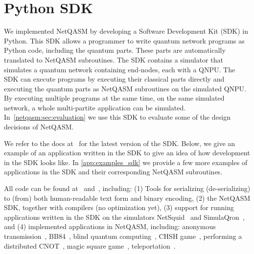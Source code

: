 \section{Python SDK}
\label{sec:python-sdk}
We implemented \ac{NetQASM} by developing a Software Development Kit (SDK) in Python.
This SDK allows a programmer to write quantum network programs as Python code, including the quantum parts.
These parts are automatically translated to NetQASM subroutines.
The SDK contains a simulator that simulates a quantum network containing end-nodes, each with a \ac{QNPU}.
The SDK can execute programs by executing their classical parts directly and executing the quantum parts as \ac{NetQASM} subroutines on the simulated \ac{QNPU}.
By executing multiple programs at the same time, on the same simulated network, a whole multi-partite application can be simulated.
In~\cref{netqasm:sec:evaluation} we use this SDK to evaluate some of the design decisions of \ac{NetQASM}.

We refer to the docs at~\cite{git_netqasm} for the latest version of the SDK.
Below, we give an example of an application written in the SDK to give an idea of how development in the SDK looks like.
In \cref{app:examples_sdk} we provide a few more examples of applications in the SDK and their corresponding \ac{NetQASM} subroutines.

All code can be found at~\cite{git_netqasm} and~\cite{git_squidasm}, including:
    (1) Tools for serializing (de-serializing) to (from) both human-readable text form and binary encoding,
    (2) the \ac{NetQASM} SDK, together with compilers (no optimization yet),
    (3) support for running applications written in the SDK on the simulators NetSquid~\cite{netsquid,coopmans2021netsquid} and SimulaQron~\cite{dahlberg2018simulaqron}, and
    (4) implemented applications in \ac{NetQASM}, including: anonymous transmission~\cite{Christandl2005anonymous}, BB84~\cite{bb84}, blind quantum computing~\cite{broadbent2009universal,fitzsimons2017unconditionally}, CHSH game~\cite{Kaniewski2016}, performing a distributed CNOT~\cite{denchev2008distributed}, magic square game~\cite{brassard1999magicsquare}, teleportation~\cite{bennett1993teleporting}.

